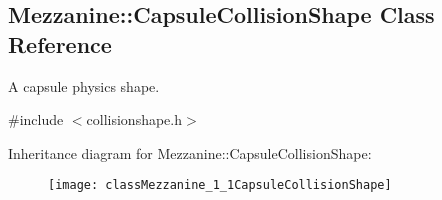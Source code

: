 \hypertarget{classMezzanine_1_1CapsuleCollisionShape}{
\subsection{Mezzanine::CapsuleCollisionShape Class Reference}
\label{classMezzanine_1_1CapsuleCollisionShape}
}


A capsule physics shape.  




{\ttfamily \#include $<$collisionshape.h$>$}

Inheritance diagram for Mezzanine::CapsuleCollisionShape:\begin{figure}[H]
\begin{center}
\leavevmode
\texttt{[image: classMezzanine\_1\_1CapsuleCollisionShape]}
\end{center}
\end{figure}
